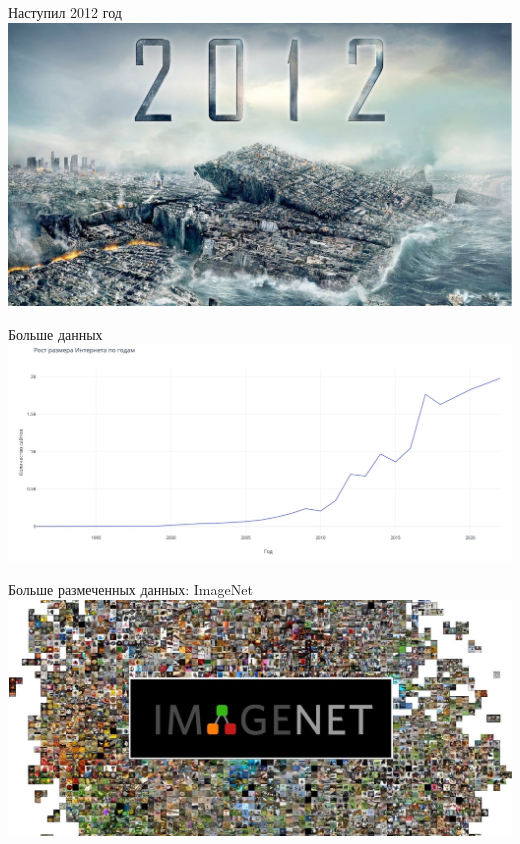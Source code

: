 \documentclass[aspectratio=169, professionalfonts]{beamer}
\begin{document}
\begin{frame}{Наступил 2012 год}
    \centering
    \includegraphics[width=.85\linewidth]{figures/fig47-2012.jpg}
\end{frame}

\begin{frame}{Больше данных}
    \centering
    \includegraphics[width=\linewidth]{figures/fig48-internet-growth.jpg}
\end{frame}

\begin{frame}{Больше размеченных данных: ImageNet}
    \centering
    \includegraphics[width=\linewidth]{figures/fig49-imagenet.jpg}
\end{frame}
\end{document}
